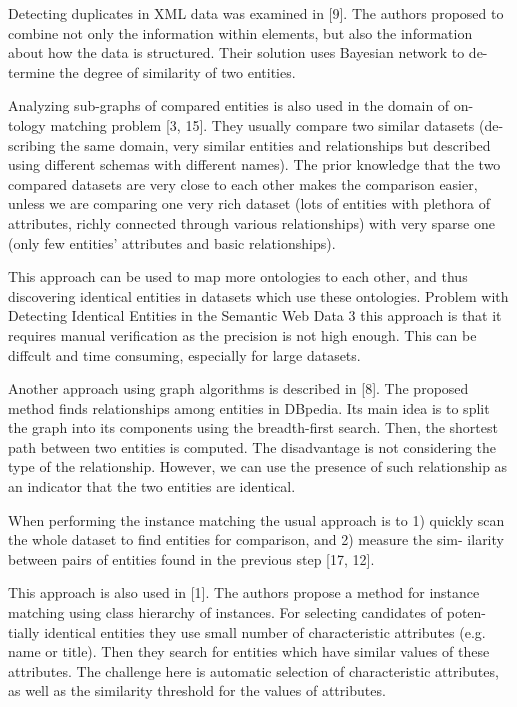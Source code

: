 \documentclass{llncs}
\begin{document}
Detecting duplicates in XML data was examined in [9]. The authors proposed
to combine not only the information within elements, but also the information
about how the data is structured. Their solution uses Bayesian network to de-
termine the degree of similarity of two entities.

Analyzing sub-graphs of compared entities is also used in the domain of on-
tology matching problem [3, 15]. They usually compare two similar datasets (de-
scribing the same domain, very similar entities and relationships but described
using different schemas with different names). The prior knowledge that the two
compared datasets are very close to each other makes the comparison easier,
unless we are comparing one very rich dataset (lots of entities with plethora of
attributes, richly connected through various relationships) with very sparse one
(only few entities' attributes and basic relationships).

This approach can be used to map more ontologies to each other, and thus
discovering identical entities in datasets which use these ontologies. Problem with
Detecting Identical Entities in the Semantic Web Data 3
this approach is that it requires manual verification as the precision is not high
enough. This can be diffcult and time consuming, especially for large datasets.

Another approach using graph algorithms is described in [8]. The proposed
method finds relationships among entities in DBpedia. Its main idea is to split
the graph into its components using the breadth-first search. Then, the shortest
path between two entities is computed. The disadvantage is not considering the
type of the relationship. However, we can use the presence of such relationship
as an indicator that the two entities are identical.

When performing the instance matching the usual approach is to 1) quickly
scan the whole dataset to find entities for comparison, and 2) measure the sim-
ilarity between pairs of entities found in the previous step [17, 12].

This approach is also used in [1]. The authors propose a method for instance
matching using class hierarchy of instances. For selecting candidates of poten-
tially identical entities they use small number of characteristic attributes (e.g.
name or title). Then they search for entities which have similar values of these
attributes. The challenge here is automatic selection of characteristic attributes,
as well as the similarity threshold for the values of attributes.
\end{document}
